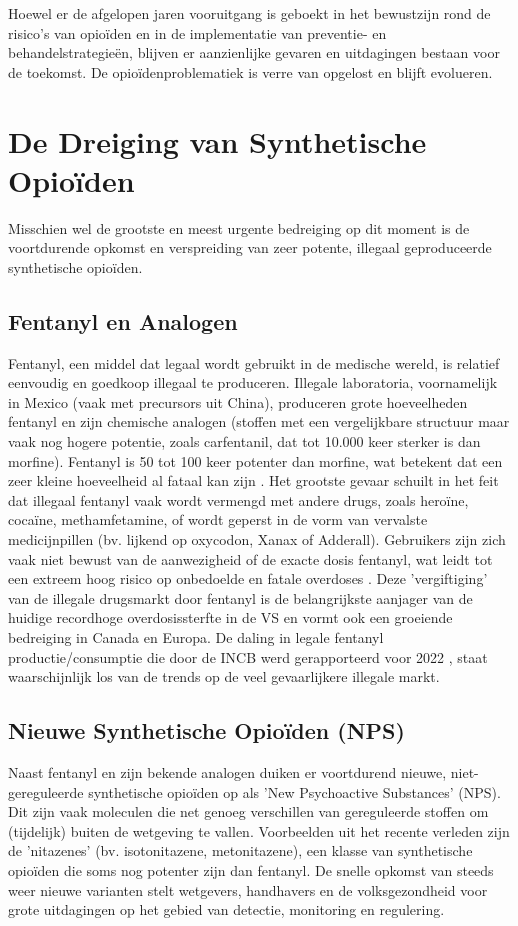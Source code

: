 \documentclass[11pt, a4paper]{report} %
\begin{document}
Hoewel er de afgelopen jaren vooruitgang is geboekt in het bewustzijn rond de risico's van opioïden en in de implementatie van preventie- en behandelstrategieën, blijven er aanzienlijke gevaren en uitdagingen bestaan voor de toekomst. De opioïdenproblematiek is verre van opgelost en blijft evolueren.

\section{De Dreiging van Synthetische Opioïden}
Misschien wel de grootste en meest urgente bedreiging op dit moment is de voortdurende opkomst en verspreiding van zeer potente, illegaal geproduceerde synthetische opioïden.
\subsection{Fentanyl en Analogen}
Fentanyl, een middel dat legaal wordt gebruikt in de medische wereld, is relatief eenvoudig en goedkoop illegaal te produceren. Illegale laboratoria, voornamelijk in Mexico (vaak met precursors uit China), produceren grote hoeveelheden fentanyl en zijn chemische analogen (stoffen met een vergelijkbare structuur maar vaak nog hogere potentie, zoals carfentanil, dat tot 10.000 keer sterker is dan morfine). Fentanyl is 50 tot 100 keer potenter dan morfine, wat betekent dat een zeer kleine hoeveelheid al fataal kan zijn \parencite{ClevelandClinicOpioids}. Het grootste gevaar schuilt in het feit dat illegaal fentanyl vaak wordt vermengd met andere drugs, zoals heroïne, cocaïne, methamfetamine, of wordt geperst in de vorm van vervalste medicijnpillen (bv. lijkend op oxycodon, Xanax of Adderall). Gebruikers zijn zich vaak niet bewust van de aanwezigheid of de exacte dosis fentanyl, wat leidt tot een extreem hoog risico op onbedoelde en fatale overdoses \parencite{CDCUnderstandingEpidemic}. Deze 'vergiftiging' van de illegale drugsmarkt door fentanyl is de belangrijkste aanjager van de huidige recordhoge overdosissterfte in de VS en vormt ook een groeiende bedreiging in Canada en Europa. De daling in legale fentanyl productie/consumptie die door de INCB werd gerapporteerd voor 2022 \parencite{INCB2024Report}, staat waarschijnlijk los van de trends op de veel gevaarlijkere illegale markt.

\subsection{Nieuwe Synthetische Opioïden (NPS)}
Naast fentanyl en zijn bekende analogen duiken er voortdurend nieuwe, niet-gereguleerde synthetische opioïden op als 'New Psychoactive Substances' (NPS). Dit zijn vaak moleculen die net genoeg verschillen van gereguleerde stoffen om (tijdelijk) buiten de wetgeving te vallen. Voorbeelden uit het recente verleden zijn de 'nitazenes' (bv. isotonitazene, metonitazene), een klasse van synthetische opioïden die soms nog potenter zijn dan fentanyl. De snelle opkomst van steeds weer nieuwe varianten stelt wetgevers, handhavers en de volksgezondheid voor grote uitdagingen op het gebied van detectie, monitoring en regulering.
\end{document}
